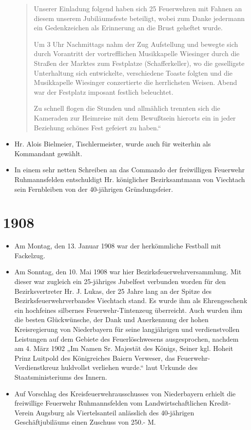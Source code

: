 \documentclass[12pt,a4paper]{book}
\begin{document}
\begin{itemize}
\begin{quote}
Unserer Einladung folgend haben sich 25 Feuerwehren mit Fahnen an diesem unserem
Jubiläumsfeste beteiligt, wobei zum Danke jedermann ein Gedenkzeichen als
Erinnerung an die Brust geheftet wurde.

Um 3 Uhr Nachmittags nahm der Zug Aufstellung und bewegte sich durch Vorantritt
der vortrefflichen Musikkapelle Wiesinger durch die Straßen der Marktes zum
Festplatze (Schafferkeller), wo die geselligste Unterhaltung sich entwickelte,
verschiedene Toaste folgten und die Musikkapelle Wiesinger conzertierte die
herrlichsten Weisen. Abend war der Festplatz imposant festlich beleuchtet.

Zu schnell flogen die Stunden und allmählich trennten sich die Kameraden zur
Heimreise mit dem Bewußtsein hierorts ein in jeder Beziehung schönes Fest
gefeiert zu haben.“
\end{quote}

\item Hr. Alois Bielmeier, Tischlermeister, wurde auch für weiterhin als
Kommandant gewählt.

\item In einem sehr netten Schreiben an das Commando der freiwilligen Feuerwehr
Ruhmannsfelden entschuldigt Hr. königlicher Bezirksamtmann von Viechtach sein
Fernbleiben von der 40-jährigen Gründungsfeier.
\end{itemize}

\section*{1908}

\begin{itemize}
\item Am Montag, den 13. Januar 1908 war der herkömmliche Festball mit
Fackelzug.

\item Am Sonntag, den 10. Mai 1908 war hier Bezirksfeuerwehrversammlung. Mit
dieser war zugleich ein 25-jähriges Jubelfest verbunden worden für den
Bezirksvertreter Hr. J. Lukas, der 25 Jahre lang an der Spitze des
Bezirksfeuerwehrverbandes Viechtach stand. Es wurde ihm als Ehrengeschenk ein
hochfeines silbernes Feuerwehr-Tintenzeug überreicht. Auch wurden ihm die besten
Glückwünsche, der Dank und Anerkennung der hohen Kreisregierung von Niederbayern
für seine langjährigen und verdienstvollen Leistungen auf dem Gebiete des
Feuerlöschwesens ausgesprochen, nachdem am 4. März 1902 „Im Namen Sr. Majestät
des Königs, Seiner kgl. Hoheit Prinz Luitpold des Königreiches Baiern Verweser,
das Feuerwehr-Verdienstkreuz huldvollst verliehen wurde.“ laut Urkunde des
Staatsministeriums des Innern.

\item Auf Vorschlag des Kreisfeuerwehrausschusses von Niederbayern erhielt die
freiwillige Feuerwehr Ruhmannsfelden vom Landwirtschaftlichen Kredit-Verein
Augsburg als Viertelsanteil anlässlich des 40-jährigen Geschäftjubiläums einen
Zuschuss von 250.- M.
\end{itemize}
\end{document}
